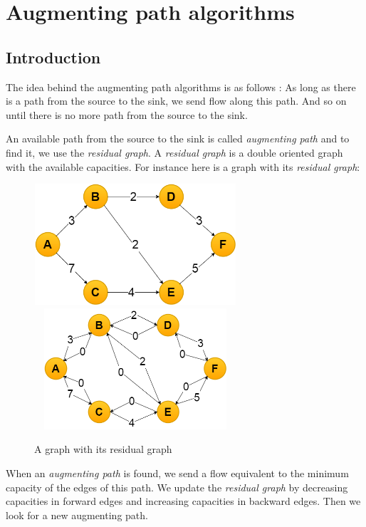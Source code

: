 \section{Augmenting path algorithms}
\subsection{Introduction}
The idea behind the augmenting path algorithms is as follows : 
As long as there is a path from the source to the sink, we send flow along this path. And so on until there is no more path from the source to the sink. \newline

An available path from the source to the sink is called \textit{augmenting path} and to find it, we use the \textit{residual graph}. A \textit{residual graph} is a double oriented graph with the available capacities. For instance here is a graph with its \textit{residual graph}: \newline

\begin{figure}[!h]
\includegraphics[width=7.5cm,height=4.5cm]{images/graph.png}\hfill
\includegraphics[width=7.5cm,height=4.5cm]{images/residualgraph.png}
\caption{A graph with its residual graph}
\end{figure}


When an \textit{augmenting path} is found, we send a flow equivalent to the minimum capacity of the edges of this path. We update the \textit{residual graph} by decreasing capacities in forward edges and increasing capacities in backward edges. Then we look for a new augmenting path. \newline

